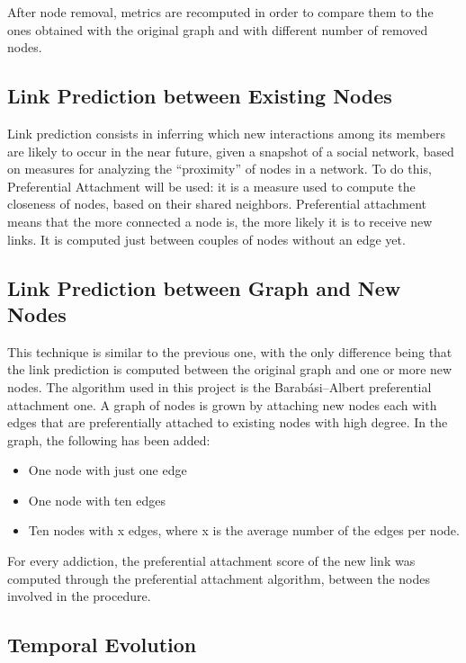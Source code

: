 \documentclass[10pt,twocolumn,letterpaper]{article}
\begin{document}
After node removal, metrics are recomputed in order to compare them to the ones obtained with the original graph and with different number of removed nodes.


\subsection{Link Prediction between Existing Nodes}

Link prediction consists in inferring which new interactions among its members are likely to occur in the near future, given a snapshot of a social network, based on measures for analyzing the “proximity” of nodes in a network. To do this, Preferential Attachment will be used: it is a measure used to compute the closeness of nodes, based on their shared neighbors. Preferential attachment means that the more connected a node is, the more likely it is to receive new links. It is computed just between couples of nodes without an edge yet.

\subsection{Link Prediction between Graph and New Nodes}

This technique is similar to the previous one, with the only difference being that the link prediction is computed between the original graph and one or more new nodes. The algorithm used in this project is the Barabási–Albert preferential attachment one. A graph of nodes is grown by attaching new nodes each with edges that are preferentially attached to existing nodes with high degree. 
In the graph, the following has been added:
\begin{itemize}
    \item One node with just one edge
    \item One node with ten edges
    \item Ten nodes with x edges, where x is the average number of the edges per node.
\end{itemize}

For every addiction, the preferential attachment score of the new link was computed through the preferential attachment algorithm, between the nodes involved in the procedure.

\subsection{Temporal Evolution}
\end{document}
